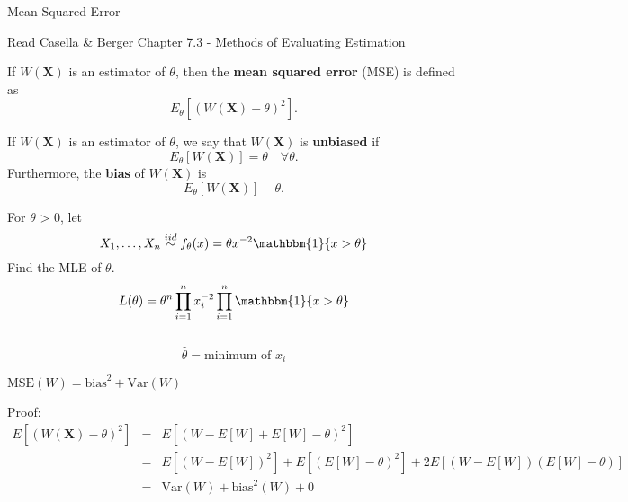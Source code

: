 \documentclass[11pt,fleqn]{book} %
\begin{document}
\begin{section}{Mean Squared Error}

\begin{remark} 
	Read Casella \& Berger Chapter 7.3 - Methods of Evaluating Estimation
\end{remark} 


\begin{definition}

If $W(\bm{X})$ is an estimator of $\theta$, then the \textbf{mean squared error} (MSE) is defined as
\[
	E_\theta\left[(W(\bm{X}) - \theta)^2\right].
\]

\end{definition}

\begin{definition}

If $W(\bm{X})$ is an estimator of $\theta$, we say that $W(\bm{X})$ is \textbf{unbiased} if
\[
	E_\theta[W(\bm{X})] = \theta \quad \forall \theta.
\]
Furthermore, the \textbf{bias} of $W(\bm{X})$ is
\[
	E_\theta[W(\bm{X})] - \theta.
\]

\end{definition}

\begin{example}
	For $\theta$ > 0, let
	$$
		X_1, \dots, X_n \stackrel{iid}{\sim} f_\theta(x)=\theta x^{-2} \mathbbm{1}\{x>\theta\}
	$$
Find the MLE of $\theta$.
$$
	L(\theta)=\theta^n \prod_{i=1}^n x_i^{-2} \prod_{i=1}^n \mathbbm{1}\{x>\theta\}$$
	\\
	$$\hat{\theta}=\text{minimum of }x_i
$$
\end{example}

\begin{theorem}
$\textrm{MSE}(W) = \textrm{bias}^2 + \textrm{Var}(W)$
\end{theorem}

Proof:
\begin{eqnarray*}
	E[(W(\bm{X})-\theta)^2] &=& E[(W-E[W]+E[W]-\theta)^2]\\
							&=& E[(W-E[W])^2]+E[(E[W]-\theta)^2]+2E[(W-E[W])(E[W]-\theta)]\\
							&=& \textrm{Var}(W) + \textrm{bias}^2(W) + 0
\end{eqnarray*}

\end{section}
\end{document}
